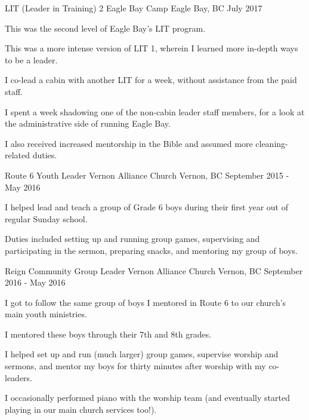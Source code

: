 \begin{cventries}
  \cventry
    {LIT (Leader in Training) 2} %
    {Eagle Bay Camp} %
    {Eagle Bay, BC} %
    {July 2017} %
    {
      \begin{cvitems} %
        \item{This was the second level of Eagle Bay's LIT program.}
        \item{This was a more intense version of LIT 1, wherein I learned more in-depth ways to be a leader.}
        \item{I co-lead a cabin with another LIT for a week, without assistance from the paid staff.}
        \item{I spent a week shadowing one of the non-cabin leader staff members, for a look at the administrative side of running Eagle Bay.}
        \item{I also received increased mentorship in the Bible and assumed more cleaning-related duties.}
      \end{cvitems}
    }

  \cventry
    {Route 6 Youth Leader} %
    {Vernon Alliance Church} %
    {Vernon, BC} %
    {September 2015 - May 2016} %
    {
      \begin{cvitems} %
        \item{I helped lead and teach a group of Grade 6 boys during their first year out of regular Sunday school.}
        \item{Duties included setting up and running group games, supervising and participating in the sermon, preparing snacks, and mentoring my group of boys.}
      \end{cvitems}
    }

  \cventry
    {Reign Community Group Leader} %
    {Vernon Alliance Church} %
    {Vernon, BC} %
    {September 2016 - May 2016} %
    {
      \begin{cvitems} %
        \item{I got to follow the same group of boys I mentored in Route 6 to our church's main youth ministries.}
        \item{I mentored these boys through their 7th and 8th grades.}
        \item{I helped set up and run (much larger) group games, supervise worship and sermons, and mentor my boys for thirty minutes after worship with my co-leaders.}
        \item{I occasionally performed piano with the worship team (and eventually started playing in our main church services too!).}
      \end{cvitems}
    }


\end{cventries}
